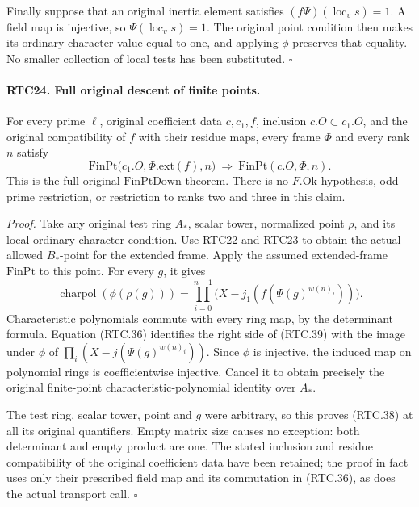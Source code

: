 Finally suppose that an original inertia element satisfies
\((f\Psi)(\operatorname{loc}_v s)=1\).  A field map is
injective, so \(\Psi(\operatorname{loc}_v s)=1\).
The original point condition then makes its ordinary character
value equal to one, and applying \(\phi\) preserves that
equality.  No smaller collection of local tests has been substituted.
\hfill\(\square\)

\paragraph{RTC24. Full original descent of finite points.}
\label{claim:RTC24}
For every prime \(\ell\), original coefficient data
\(c,c_1,f\), inclusion \(c.O\subset c_1.O\), and the
original compatibility of \(f\) with their residue maps,
every frame \(\Phi\) and every rank \(n\) satisfy
\[
 \mathrm{FinPt}\bigl(c_1.O,\Phi.\mathrm{ext}(f),n\bigr)
       \ \Longrightarrow\
 \mathrm{FinPt}(c.O,\Phi,n).
                                                        \tag{RTC.38}
\]
This is the full original \(\mathrm{FinPtDown}\) theorem.
There is no \(F.\mathrm{Ok}\) hypothesis, odd-prime
restriction, or restriction to ranks two and three in this claim.

\emph{Proof.}
Take any original test ring \(A_*\), scalar tower, normalized
point \(\rho\), and its local ordinary-character condition.
Use RTC22 and RTC23 to obtain the actual allowed \(B_*\)-point
for the extended frame.  Apply the assumed extended-frame
\(\mathrm{FinPt}\) to this point.  For every \(g\), it gives
\[
 \operatorname{charpol}(\phi(\rho(g)))
     =\prod_{i=0}^{n-1}
         \bigl(X-j_1(f(\Psi(g)^{w(n)_i}))\bigr).
                                                        \tag{RTC.39}
\]
Characteristic polynomials commute with every ring map, by the
determinant formula.  Equation (RTC.36) identifies the right side
of (RTC.39) with the image under \(\phi\) of
\(\prod_i(X-j(\Psi(g)^{w(n)_i}))\).  Since \(\phi\) is
injective, the induced map on polynomial rings is coefficientwise
injective.  Cancel it to obtain precisely the original finite-point
characteristic-polynomial identity over \(A_*\).

The test ring, scalar tower, point and \(g\) were arbitrary,
so this proves (RTC.38) at all its original quantifiers.  Empty
matrix size causes no exception: both determinant and empty product
are one.  The stated inclusion and residue compatibility of the
original coefficient data have been retained; the proof in fact
uses only their prescribed field map and its commutation in
(RTC.36), as does the actual transport call. \hfill\(\square\)

